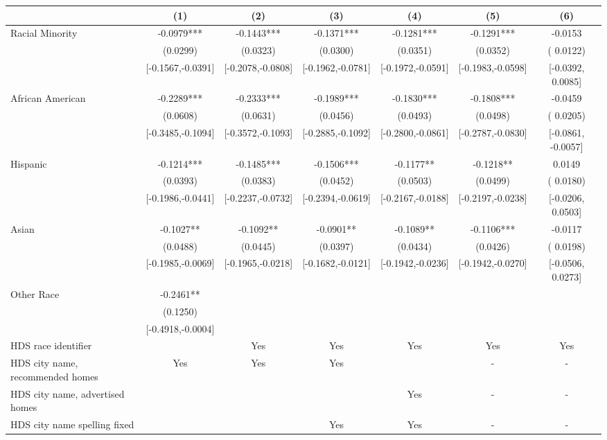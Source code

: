 \begin{table}[htbp]
{\begin{tabular}{l*{6}{c}}
                    \cmidrule(lr){2-2}\cmidrule(lr){3-3}\cmidrule(lr){4-4}\cmidrule(lr){5-5}\cmidrule(lr){6-6}\cmidrule(lr){7-7}
                    &\multicolumn{1}{c}{(1)}   &\multicolumn{1}{c}{(2)}   &\multicolumn{1}{c}{(3)}   &\multicolumn{1}{c}{(4)}   &\multicolumn{1}{c}{(5)}   &\multicolumn{1}{c}{(6)}\\
\midrule
Racial Minority & -0.0979*** & -0.1443*** & -0.1371*** & -0.1281*** & -0.1291*** & -0.0153 \\
 & (0.0299) & (0.0323) & (0.0300) & (0.0351) & (0.0352) & ( 0.0122) \\
 & [-0.1567,-0.0391] & [-0.2078,-0.0808] & [-0.1962,-0.0781] & [-0.1972,-0.0591] & [-0.1983,-0.0598] & [-0.0392,  0.0085] \\
\midrule
African American & -0.2289*** & -0.2333*** & -0.1989*** & -0.1830*** & -0.1808*** & -0.0459\sym{**} \\
 & (0.0608) & (0.0631) & (0.0456) & (0.0493) & (0.0498) & ( 0.0205) \\
 & [-0.3485,-0.1094] & [-0.3572,-0.1093] & [-0.2885,-0.1092] & [-0.2800,-0.0861] & [-0.2787,-0.0830] & [-0.0861, -0.0057] \\
Hispanic & -0.1214*** & -0.1485*** & -0.1506*** & -0.1177** & -0.1218** & 0.0149 \\
 & (0.0393) & (0.0383) & (0.0452) & (0.0503) & (0.0499) & ( 0.0180) \\
 & [-0.1986,-0.0441] & [-0.2237,-0.0732] & [-0.2394,-0.0619] & [-0.2167,-0.0188] & [-0.2197,-0.0238] & [-0.0206,  0.0503] \\
Asian & -0.1027** & -0.1092** & -0.0901** & -0.1089** & -0.1106*** & -0.0117 \\
 & (0.0488) & (0.0445) & (0.0397) & (0.0434) & (0.0426) & ( 0.0198) \\
 & [-0.1985,-0.0069] & [-0.1965,-0.0218] & [-0.1682,-0.0121] & [-0.1942,-0.0236] & [-0.1942,-0.0270] & [-0.0506,  0.0273] \\
Other Race & -0.2461** &  &  &  &  &  \\
 & (0.1250) &  &  &  &  &  \\
 & [-0.4918,-0.0004] &  &  &  &  &  \\
\midrule
HDS race identifier & & Yes & Yes & Yes & Yes & Yes \\
HDS city name, recommended homes & Yes & Yes & Yes & & - & -\\
HDS city name, advertised homes &  &  &  & Yes & - & -\\
HDS city name spelling fixed & & & Yes & Yes & - & -\\

\end{tabular}}
\end{table}
